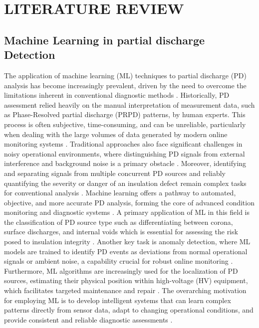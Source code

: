 \chapter{LITERATURE REVIEW}

\section{Machine Learning in partial discharge Detection}

The application of machine learning (ML) techniques to partial discharge (PD) analysis has become increasingly prevalent, driven by the need to overcome the limitations inherent in conventional diagnostic methods \parencite{Masud_2016, Lu_2020_2}. Historically, PD assessment relied heavily on the manual interpretation of measurement data, such as Phase-Resolved partial discharge (PRPD) patterns, by human experts. This process is often subjective, time-consuming, and can be unreliable, particularly when dealing with the large volumes of data generated by modern online monitoring systems \parencite{Seri_2021, Alsumaidaee_2022}. Traditional approaches also face significant challenges in noisy operational environments, where distinguishing PD signals from external interference and background noise is a primary obstacle \parencite{Ghosh_2020, Park_2023_1}. Moreover, identifying and separating signals from multiple concurrent PD sources \parencite{Baug_2017, Firuzi_2017} and reliably quantifying the severity or danger of an insulation defect remain complex tasks for conventional analysis \parencite{Ma_2021_3, Orellana_2023_1}. Machine learning offers a pathway to automated, objective, and more accurate PD analysis, forming the core of advanced condition monitoring and diagnostic systems \parencite{Lu_2020_2}. A primary application of ML in this field is the classification of PD source type such as differentiating between corona, surface discharges, and internal voids which is essential for assessing the risk posed to insulation integrity \parencite{Anjum_2017_1, Borghei_2022_1}. Another key task is anomaly detection, where ML models are trained to identify PD events as deviations from normal operational signals or ambient noise, a capability crucial for robust online monitoring \parencite{Thi_2020, Florkowski_2021_1}. Furthermore, ML algorithms are increasingly used for the localization of PD sources, estimating their physical position within high-voltage (HV) equipment, which facilitates targeted maintenance and repair \parencite{Liu_2020_4, Chan_2023}. The overarching motivation for employing ML is to develop intelligent systems that can learn complex patterns directly from sensor data, adapt to changing operational conditions, and provide consistent and reliable diagnostic assessments \parencite{Sikorski_2025}.

